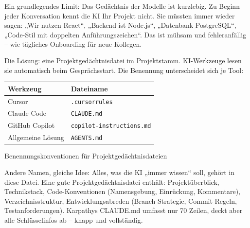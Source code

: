 


Ein grundlegendes Limit: Das Gedächtnis der Modelle ist kurzlebig. Zu Beginn jeder Konversation kennt die KI Ihr Projekt nicht. Sie müssten immer wieder sagen: „Wir nutzen React“, „Backend ist Node.js“, „Datenbank PostgreSQL“, „Code-Stil mit doppelten Anführungszeichen“. Das ist mühsam und fehleranfällig – wie tägliches Onboarding für neue Kollegen.

Die Lösung: eine Projektgedächtnisdatei im Projektstamm. KI-Werkzeuge lesen sie automatisch beim Gesprächsstart. Die Benennung unterscheidet sich je Tool:

\begin{center}
\begin{tabularx}{\linewidth}{|X|X|}
\hline
\textbf{Werkzeug} & \textbf{Dateiname} \tabularnewline
\hline
Cursor & \texttt{.\allowbreak cursorrules} \tabularnewline
Claude Code & \texttt{CLAUDE.\allowbreak md} \tabularnewline
GitHub Copilot & \texttt{copilot-\allowbreak instructions.\allowbreak md} \tabularnewline
Allgemeine Lösung & \texttt{AGENTS.\allowbreak md} \tabularnewline
\hline
\end{tabularx}
\end{center}

\begin{center}\small\color{gray}Benennungskonventionen für Projektgedächtnisdateien\end{center}

Andere Namen, gleiche Idee: Alles, was die KI „immer wissen“ soll, gehört in diese Datei. Eine gute Projektgedächtnisdatei enthält: Projektüberblick, Technikstack, Code-Konventionen (Namensgebung, Einrückung, Kommentare), Verzeichnisstruktur, Entwicklungsabreden (Branch-Strategie, Commit-Regeln, Testanforderungen). Karpathys CLAUDE.md umfasst nur 70 Zeilen, deckt aber alle Schlüsselinfos ab – knapp und vollständig.

